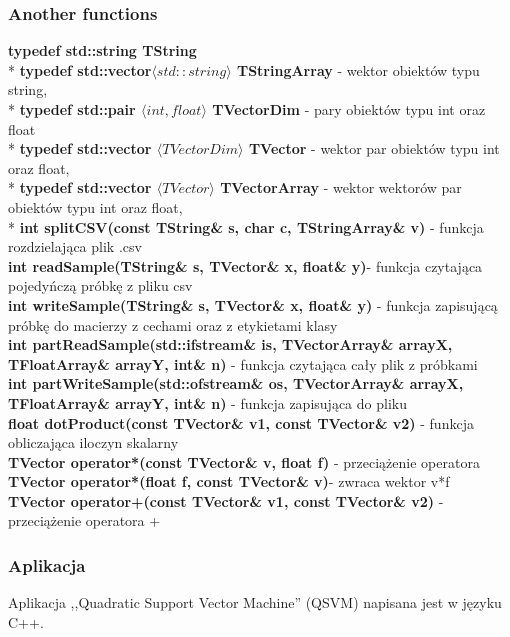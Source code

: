\documentclass[[10pt,a4paper]{article}
\begin{document}
\begin{enumerate}
\subsubsection{Another functions}
\setlength{\parskip}{1ex plus 0.5ex minus 0.2ex}
\textbf{typedef std::string TString}\\*
\textbf{typedef std::vector$\langle std::string\rangle$ TStringArray} - wektor obiektów typu string,\\*	
\textbf{typedef std::pair $\langle int, float \rangle$ TVectorDim} - pary obiektów typu int oraz float\\*
\textbf{typedef std::vector $\langle TVectorDim \rangle$ TVector }- wektor par obiektów typu int oraz float,\\*
\textbf{typedef std::vector $\langle TVector \rangle$ TVectorArray} - wektor wektorów par obiektów typu int oraz float, \\*
\textbf{int splitCSV(const TString\& s, char c, TStringArray\& v)} - funkcja rozdzielająca plik .csv\\
\textbf{int readSample(TString\& s, TVector\& x, float\& y)}- funkcja czytająca pojedyńczą próbkę z pliku csv\\
\textbf{int writeSample(TString\& s, TVector\& x, float\& y)} - funkcja zapisującą próbkę do macierzy z cechami oraz z etykietami klasy\\
\textbf{int partReadSample(std::ifstream\& is, TVectorArray\& arrayX, TFloatArray\& arrayY, int\& n) }- funkcja czytająca cały plik z próbkami\\
\textbf{int partWriteSample(std::ofstream\& os, TVectorArray\& arrayX, TFloatArray\& arrayY, int\& n)} - funkcja zapisująca do pliku\\
\textbf{float dotProduct(const TVector\& v1, const TVector\& v2)} - funkcja obliczająca iloczyn skalarny\\
\textbf{TVector operator*(const TVector\& v, float f) }- przeciążenie operatora \\
\textbf{TVector operator*(float f, const TVector\& v)}- zwraca wektor v*f\\
\textbf{TVector operator+(const TVector\& v1, const TVector\& v2) }- przeciążenie operatora +\\

\subsubsection{Aplikacja}
\noindent Aplikacja ,,Quadratic Support Vector Machine'' (QSVM) napisana jest w języku C++.


\end{enumerate}
\end{document}
